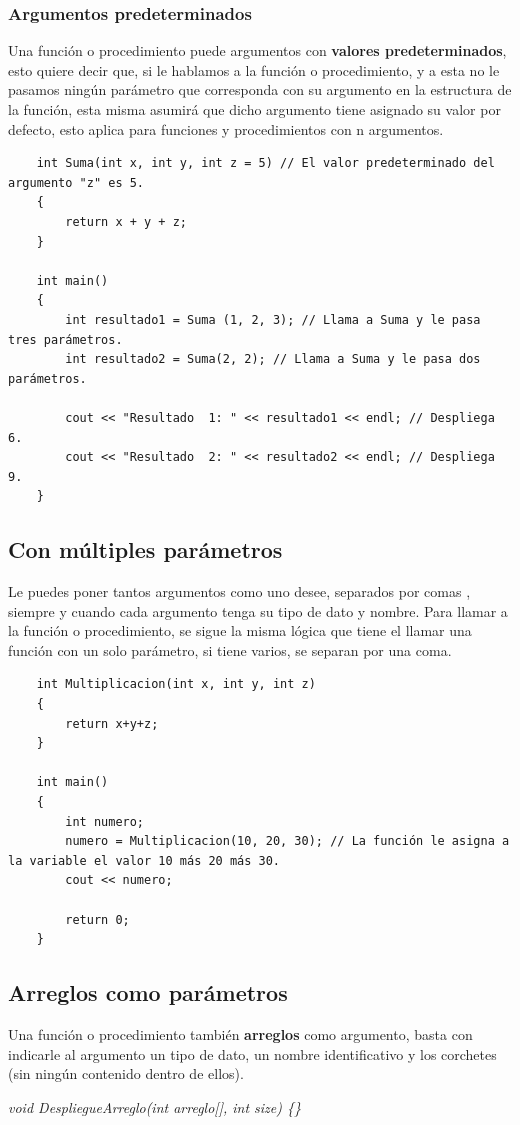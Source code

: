 \subsubsection{Argumentos predeterminados}
\hspace{0.55cm}Una función o procedimiento puede argumentos con \textbf{valores predeterminados}, esto quiere decir que, si le hablamos a la función o procedimiento, y a esta no le pasamos ningún parámetro que corresponda con su argumento en la estructura de la función, esta misma asumirá que dicho argumento tiene asignado su valor por defecto, esto aplica para funciones y procedimientos con n argumentos.
\begin{lstlisting}
    int Suma(int x, int y, int z = 5) // El valor predeterminado del argumento "z" es 5.
    {
        return x + y + z;
    }
    
    int main()
    {
        int resultado1 = Suma (1, 2, 3); // Llama a Suma y le pasa tres parámetros.
        int resultado2 = Suma(2, 2); // Llama a Suma y le pasa dos parámetros.
        
        cout << "Resultado  1: " << resultado1 << endl; // Despliega 6.
        cout << "Resultado  2: " << resultado2 << endl; // Despliega 9.
    }
\end{lstlisting}


\subsection{Con múltiples parámetros}
\hspace{0.55cm}Le puedes poner tantos argumentos como uno desee, separados por comas , siempre y cuando cada argumento tenga su tipo de dato y nombre. Para llamar a la función o procedimiento, se sigue la misma lógica que tiene el llamar una función con un solo parámetro, si tiene varios, se separan por una coma. 
\begin{lstlisting}
    int Multiplicacion(int x, int y, int z)
    {
        return x+y+z;
    }
    
    int main()
    {
        int numero;
        numero = Multiplicacion(10, 20, 30); // La función le asigna a la variable el valor 10 más 20 más 30.
        cout << numero;
        
        return 0;
    }
\end{lstlisting}


\subsection{Arreglos como parámetros}
\hspace{0.55cm}Una función o procedimiento también \textbf{arreglos} como argumento, basta con indicarle al argumento un tipo de dato, un nombre identificativo y los corchetes (sin ningún contenido dentro de ellos).\begin{center}\textit{void DespliegueArreglo(int arreglo[], int size) \{\}}\end{center}

